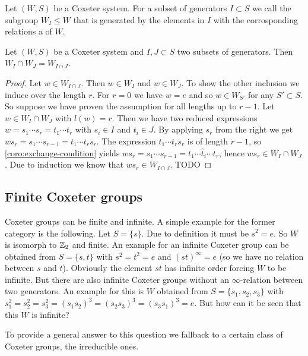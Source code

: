 \begin{defi}
	Let $(W,S)$ be a Coxeter system. For a subset of generators $I \subset S$ we call the subgroup $W_I \leq W$ that is generated by the elements in $I$ with the corrosponding relations a  of $W$.
\end{defi}

\begin{lemm}
	Let $(W,S)$ be a Coxeter system and $I,J \subset S$ two subsets of generators. Then ${W_I \cap W_J} = W_{I \cap J}$.

	\begin{proof}
		Let $w \in W_{I \cap J}$. Then $w \in W_I$ and $w \in W_J$. To show the other inclusion we induce over the length $r$. For $r = 0$ we have $w = e$ and so $w \in W_{S'}$ for any $S' \subset S$. So suppose we have proven the assumption for all lengths up to $r-1$. Let $w \in W_I \cap W_J$ with $l(w) = r$. Then we have two reduced expressions $w = s_1 \cdots s_r = t_1 \cdots t_r$ with $s_i \in I$ and $t_i \in J$. By applying $s_r$ from the right we get $w s_r = s_1 \cdots s_{r-1} = t_1 \cdots t_r s_r$. The expression $t_1 \cdots t_r s_r$ is of length $r-1$, so \ref{coro:exchange-condition} yields $w s_r = s_1 \cdots s_{r-1} = t_1 \cdots \hat t_i \cdots t_r$, hence $w s_r \in W_I \cap W_J$. Due to induction we know that $w s_r \in W_{I \cap J}$. TODO
	\end{proof}
\end{lemm}

\subsection{Finite Coxeter groups}

Coxeter groups can be finite and infinite. A simple example for the former category is the following. Let $S = \{ s \}$. Due to definition it must be $s^2 = e$. So $W$ is isomorph to $\mathbb{Z}_2$ and finite. An example for an infinite Coxeter group can be obtained from $S = \{s,t\}$ with $s^2=t^2=e$ and $(st)^\infty = e$ (so we have no relation between $s$ and $t$). Obviously the element $st$ has infinite order forcing $W$ to be infinite. But there are also infinite Coxeter groups without an $\infty$-relation between two generators. An example for this is $W$ obtained from $S=\{s_1,s_2,s_3\}$ with $s_1^2=s_2^2=s_3^2=(s_1 s_2)^3=(s_2 s_3)^3=(s_3 s_1)^3=e$. But how can it be seen that this $W$ is infinite?

To provide a general answer to this question we fallback to a certain class of Coxeter groups, the irreducible ones.

